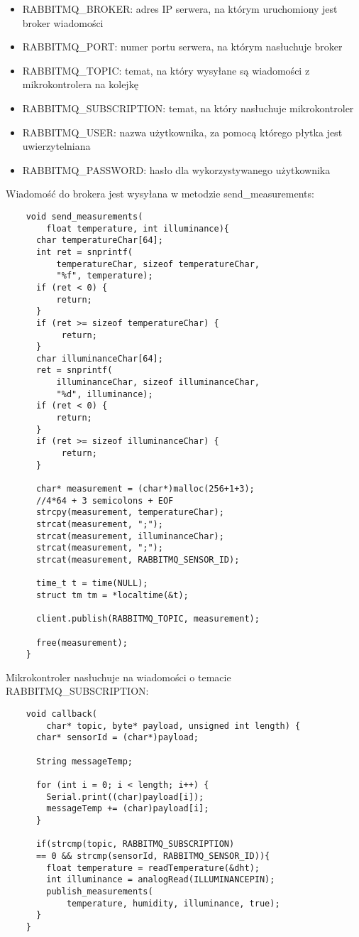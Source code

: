 \begin{itemize}
    \item RABBITMQ\_BROKER: adres IP serwera, na którym uruchomiony jest broker wiadomości
    \item RABBITMQ\_PORT: numer portu serwera, na którym nasłuchuje broker
    \item RABBITMQ\_TOPIC: temat, na który wysyłane są wiadomości z mikrokontrolera
    na kolejkę
    \item RABBITMQ\_SUBSCRIPTION: temat, na który nasłuchuje mikrokontroler
    \item RABBITMQ\_USER: nazwa użytkownika, za pomocą którego płytka jest uwierzytelniana
    \item RABBITMQ\_PASSWORD: hasło dla wykorzystywanego użytkownika
\end{itemize}

Wiadomość do brokera jest wysyłana w metodzie send\_measurements:

\begin{lstlisting}
    void send_measurements(
        float temperature, int illuminance){
      char temperatureChar[64];
      int ret = snprintf(
          temperatureChar, sizeof temperatureChar, 
          "%f", temperature);
      if (ret < 0) {
          return;
      }
      if (ret >= sizeof temperatureChar) {
           return;
      }
      char illuminanceChar[64];
      ret = snprintf(
          illuminanceChar, sizeof illuminanceChar, 
          "%d", illuminance);
      if (ret < 0) {
          return;
      }
      if (ret >= sizeof illuminanceChar) {
           return;
      }
    
      char* measurement = (char*)malloc(256+1+3); 
      //4*64 + 3 semicolons + EOF
      strcpy(measurement, temperatureChar);
      strcat(measurement, ";");
      strcat(measurement, illuminanceChar);
      strcat(measurement, ";");
      strcat(measurement, RABBITMQ_SENSOR_ID);
    
      time_t t = time(NULL);
      struct tm tm = *localtime(&t);
    
      client.publish(RABBITMQ_TOPIC, measurement);
    
      free(measurement);
    }
\end{lstlisting}

Mikrokontroler nasłuchuje na wiadomości o temacie \\RABBITMQ\_SUBSCRIPTION:

\begin{lstlisting}
    void callback(
        char* topic, byte* payload, unsigned int length) {
      char* sensorId = (char*)payload;
    
      String messageTemp;
      
      for (int i = 0; i < length; i++) {
        Serial.print((char)payload[i]);
        messageTemp += (char)payload[i];
      }
    
      if(strcmp(topic, RABBITMQ_SUBSCRIPTION) 
      == 0 && strcmp(sensorId, RABBITMQ_SENSOR_ID)){
        float temperature = readTemperature(&dht);
        int illuminance = analogRead(ILLUMINANCEPIN);
        publish_measurements(
            temperature, humidity, illuminance, true);
      }
    }
\end{lstlisting}